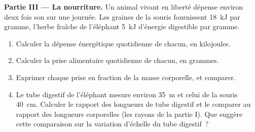 \begin{problem}
\medskip
\noindent\textbf{Partie III --- La nourriture.}
Un animal vivant en liberté dépense environ deux fois son  sur une journée. Les graines de la souris fournissent
\qty{18}{kJ} par gramme, l'herbe fraîche de l'éléphant \qty{5}{kJ}
d'énergie digestible par gramme.
\begin{enumerate}[resume]
  \item Calculer la dépense énergétique quotidienne de chacun, en
        kilojoules.
  \item Calculer la prise alimentaire quotidienne de chacun, en grammes.
  \item Exprimer chaque prise en fraction de la masse corporelle, et
        comparer.
  \item Le tube digestif de l'éléphant mesure environ \qty{35}{m} et
        celui de la souris \qty{40}{cm}. Calculer le rapport des
        longueurs de tube digestif et le comparer au rapport des
        longueurs corporelles (les rayons de la partie I). Que suggère
        cette comparaison sur la variation d'échelle du tube digestif~?
\end{enumerate}


\end{problem}
